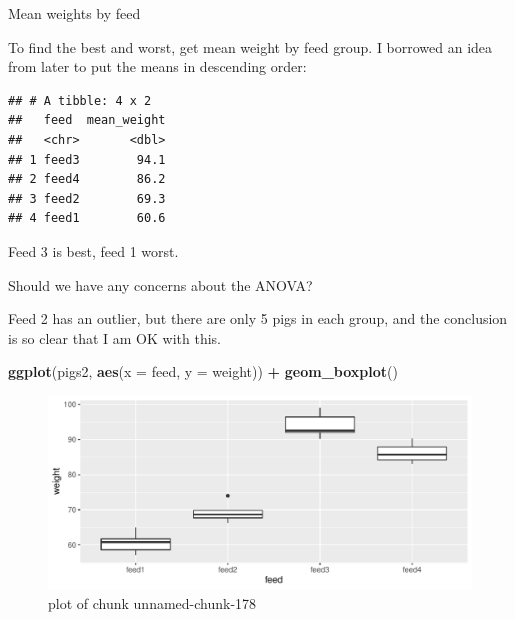 \documentclass[
  ignorenonframetext,
]{beamer}
\newenvironment{Shaded}{\begin{snugshade}}{\end{snugshade}}
\newcommand{\DataTypeTok}[1]{\textcolor[rgb]{0.13,0.29,0.53}{#1}}
\newcommand{\KeywordTok}[1]{\textcolor[rgb]{0.13,0.29,0.53}{\textbf{#1}}}
\newcommand{\NormalTok}[1]{#1}
\newcommand{\OperatorTok}[1]{\textcolor[rgb]{0.81,0.36,0.00}{\textbf{#1}}}
\newcommand{\StringTok}[1]{\textcolor[rgb]{0.31,0.60,0.02}{#1}}
\begin{document}
\begin{frame}[fragile]{Mean weights by feed}
\protect\hypertarget{mean-weights-by-feed}{}

To find the best and worst, get mean weight by feed group. I borrowed an
idea from later to put the means in descending order:

\begin{Shaded}
\end{Shaded}

\begin{verbatim}
## # A tibble: 4 x 2
##   feed  mean_weight
##   <chr>       <dbl>
## 1 feed3        94.1
## 2 feed4        86.2
## 3 feed2        69.3
## 4 feed1        60.6
\end{verbatim}

Feed 3 is best, feed 1 worst.

\end{frame}

\begin{frame}[fragile]{Should we have any concerns about the ANOVA?}
\protect\hypertarget{should-we-have-any-concerns-about-the-anova}{}

Feed 2 has an outlier, but there are only 5 pigs in each group, and the
conclusion is so clear that I am OK with this.

\begin{Shaded}
\begin{Highlighting}[]
\KeywordTok{ggplot}\NormalTok{(pigs2, }\KeywordTok{aes}\NormalTok{(}\DataTypeTok{x =}\NormalTok{ feed, }\DataTypeTok{y =}\NormalTok{ weight)) }\OperatorTok{+}\StringTok{ }\KeywordTok{geom_boxplot}\NormalTok{()}
\end{Highlighting}
\end{Shaded}

\begin{figure}
\centering
\includegraphics{figure/unnamed-chunk-178-1.pdf}
\caption{plot of chunk unnamed-chunk-178}
\end{figure}

\end{frame}
\end{document}
